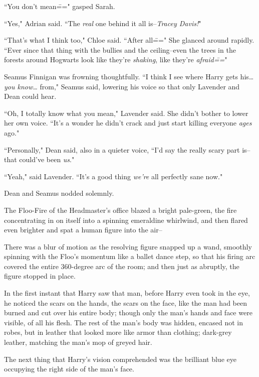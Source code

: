 ``You don't mean\===" gasped Sarah.

``Yes," Adrian said. ``The \emph{real} one behind it all is\---\emph{Tracey Davis!}"

``That's what I think too," Chloe said. ``After all\===" She glanced around rapidly. ``Ever since that thing with the bullies and the ceiling\---even the trees in the forests around Hogwarts look like they're \emph{shaking}, like they're \emph{afraid\===}"

Seamus Finnigan was frowning thoughtfully. ``I think I see where Harry gets his{\ldots} \emph{you know{\ldots}} from," Seamus said, lowering his voice so that only Lavender and Dean could hear.

``Oh, I totally know what you mean," Lavender said. She didn't bother to lower her own voice. ``It's a wonder he didn't crack and just start killing everyone \emph{ages} ago."

``Personally," Dean said, also in a quieter voice, ``I'd say the really scary part is\---that could've been \emph{us}."

``Yeah," said Lavender. ``It's a good thing \emph{we're} all perfectly sane now."

Dean and Seamus nodded solemnly.


The Floo-Fire of the Headmaster's office blazed a bright pale-green, the fire concentrating in on itself into a spinning emeraldine whirlwind, and then flared even brighter and spat a human figure into the air\---

There was a blur of motion as the resolving figure snapped up a wand, smoothly spinning with the Floo's momentum like a ballet dance step, so that his firing arc covered the entire 360-degree arc of the room; and then just as abruptly, the figure stopped in place.

In the first instant that Harry saw that man, before Harry even took in the eye, he noticed the scars on the hands, the scars on the face, like the man had been burned and cut over his entire body; though only the man's hands and face were visible, of all his flesh. The rest of the man's body was hidden, encased not in robes, but in leather that looked more like armor than clothing; dark-grey leather, matching the man's mop of greyed hair.

The next thing that Harry's vision comprehended was the brilliant blue eye occupying the right side of the man's face.

